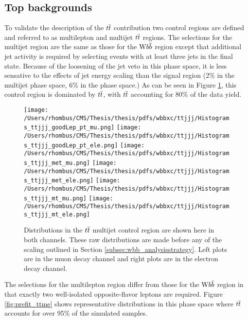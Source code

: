 \subsection{Top backgrounds}
\label{section:topbackgrounds}

To validate the description of the $t\overline{t}$ contribution two 
 control regions are defined and referred to as multilepton 
 and multijet $t\overline{t}$ regions.
The selections for the multijet region are the same as 
 those for the $\mathrm{W} b\overline{b}$ region except that additional jet
 activity is required by selecting events with at least
 three jets in the final state. 
Because of the loosening of the jet veto in this phase space,
 it is less sensative to the effects of jet energy scaling
 than the signal region (2\% in the \ttbar multijet phase space,
 6\% in the \wbb phase space.)
As can be seen in Figure \ref{fig:prefit_ttjjj},
 this control region is dominated by $t\overline{t}$, with $t\overline{t}$ accounting for
 80\% of the data yield.

\begin{figure}
      \caption[\ttbar-multijet control region for the \wbb measurement]
   {Distributions in the $t\overline{t}$ multijet control region are shown here in both channels.
       These raw distributions are made before any of the scaling outlined in Section \ref{subsec:wbb_analysisstrategy}.
       Left plots are in the muon decay channel and right
        plots are in the electron decay channel.
      }
      \center
 \texttt{[image: /Users/rhombus/CMS/Thesis/thesis/pdfs/wbbxc/ttjjj/Histograms\_ttjjj\_goodLep\_pt\_mu.png]}
 \texttt{[image: /Users/rhombus/CMS/Thesis/thesis/pdfs/wbbxc/ttjjj/Histograms\_ttjjj\_goodLep\_pt\_ele.png]}
 \texttt{[image: /Users/rhombus/CMS/Thesis/thesis/pdfs/wbbxc/ttjjj/Histograms\_ttjjj\_met\_mu.png]}
 \texttt{[image: /Users/rhombus/CMS/Thesis/thesis/pdfs/wbbxc/ttjjj/Histograms\_ttjjj\_met\_ele.png]}
 \texttt{[image: /Users/rhombus/CMS/Thesis/thesis/pdfs/wbbxc/ttjjj/Histograms\_ttjjj\_mt\_mu.png]}
 \texttt{[image: /Users/rhombus/CMS/Thesis/thesis/pdfs/wbbxc/ttjjj/Histograms\_ttjjj\_mt\_ele.png]}
      \label{fig:prefit_ttjjj}
\end{figure}


The selections for the multilepton region differ from those for
 the $\mathrm{W} b\overline{b}$ region in that exactly two well-isolated
 opposite-flavor leptons are required. 
Figure \ref{fig:prefit_ttme} shows representative distributions
 in this phase space where $t\overline{t}$ accounts for over
 95\% of the simulated samples.

